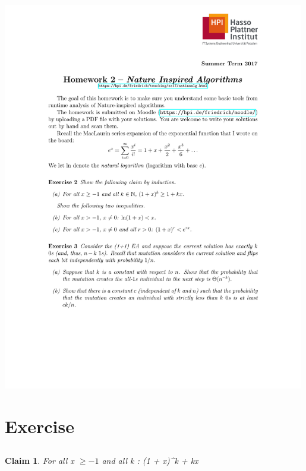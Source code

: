 \documentclass[12pt,a4paper]{article}
\newtheorem{claim}{Claim}
\begin{document}
\includegraphics[clip, trim=0.5cm 2.5cm 0.5cm 4cm, width=0.99\textwidth]{homework02.pdf}
\clearpage

\section{Exercise}
\subsection{}
\begin{claim}
For all x $\geq-1$ and all k \in {}: (1 + x)^k  + kx
\end{claim}
\end{document}

